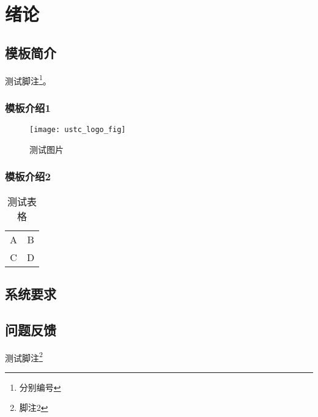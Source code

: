 \chapter{绪论}
\section{模板简介}
测试脚注\footnote{分别编号}。
\subsection{模板介绍1}
\begin{figure}[ht]
\centering
\texttt{[image: ustc\_logo\_fig]}
\caption{测试图片}
\end{figure}
\subsection{模板介绍2}

\begin{table}[ht]
\centering
\caption{测试表格}
\begin{tabular}{cc}
A   &   B   \\
C   &   D   \\
\end{tabular}
\end{table}
\section{系统要求}
\section{问题反馈}
测试脚注\footnote{脚注2}
